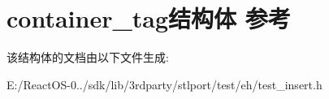 \hypertarget{structcontainer__tag}{}\section{container\+\_\+tag结构体 参考}
\label{structcontainer__tag}


该结构体的文档由以下文件生成\+:\begin{DoxyCompactItemize}
\item 
E\+:/\+React\+O\+S-\/0../sdk/lib/3rdparty/stlport/test/eh/test\+\_\+insert.\+h\end{DoxyCompactItemize}
